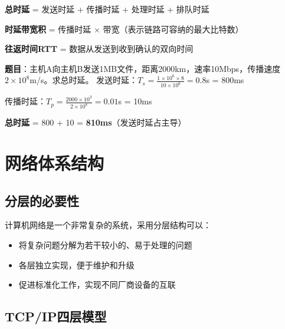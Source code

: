 \begin{formulabox}
\textbf{总时延} = 发送时延 + 传播时延 + 处理时延 + 排队时延

\textbf{时延带宽积} = 传播时延 $\times$ 带宽（表示链路可容纳的最大比特数）

\textbf{往返时间RTT} = 数据从发送到收到确认的双向时间
\end{formulabox}

\begin{examplebox}[例题1.2 时延计算]
\textbf{题目}：主机A向主机B发送1MB文件，距离2000km，速率10Mbps，传播速度$2\times10^8$m/s。求总时延。
\tcblower
发送时延：$T_s = \frac{1\times10^6\times8}{10\times10^6} = 0.8$s = 800ms

传播时延：$T_p = \frac{2000\times10^3}{2\times10^8} = 0.01$s = 10ms

\textbf{总时延} = 800 + 10 = \textbf{810ms}（发送时延占主导）
\end{examplebox}

\section{网络体系结构}
\subsection{分层的必要性}
计算机网络是一个非常复杂的系统，采用分层结构可以：
\begin{itemize}[leftmargin=2em,itemsep=0pt]
    \item 将复杂问题分解为若干较小的、易于处理的问题
    \item 各层独立实现，便于维护和升级
    \item 促进标准化工作，实现不同厂商设备的互联
\end{itemize}

\subsection{TCP/IP四层模型}
\begin{center}
\end{center}

